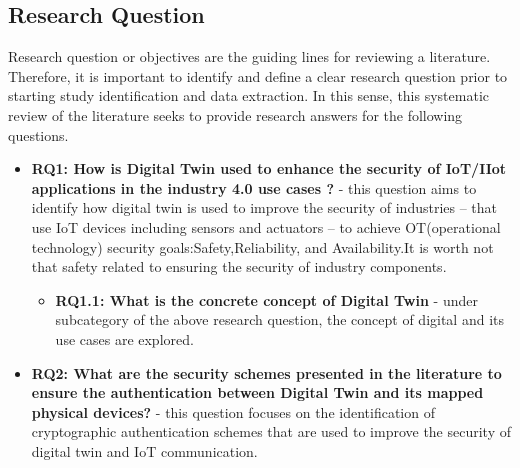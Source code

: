 
\subsection{Research Question}
Research question or objectives are the guiding lines for reviewing a literature. Therefore, it is important to identify and define a clear research question prior to starting study identification and data extraction\cite{carrera-rivera_how-conduct_2022}. In this sense, this systematic review of the literature seeks to provide research answers for the following questions.
\begin{itemize}

    \item \textbf{RQ1: How is Digital Twin used to enhance the security of IoT/IIot applications in the industry 4.0 use cases ?} - 
    this question aims to identify how digital twin is used to improve the security of industries -- that use IoT devices including sensors and actuators -- to achieve OT(operational technology) security goals:Safety,Reliability, and Availability.It is worth not that safety related to ensuring the security of industry components.
    \begin{itemize}
        \item \textbf{RQ1.1: What is the concrete concept of Digital Twin} - 
        under subcategory of the above research question, the concept of digital and its use cases are explored.
    \end{itemize}

    \item \textbf{RQ2: What are the security schemes presented in the literature to ensure the authentication between Digital Twin and its mapped physical devices?} - 
    this question focuses on the identification of cryptographic authentication schemes that are used to improve the security of digital twin and IoT communication.
    
\end{itemize}